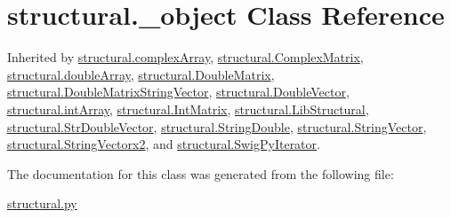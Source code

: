 \hypertarget{classstructural_1_1__object}{}\section{structural.\+\_\+object Class Reference}
\label{classstructural_1_1__object}


Inherited by \hyperlink{classstructural_1_1complex_array}{structural.\+complex\+Array}, \hyperlink{classstructural_1_1_complex_matrix}{structural.\+Complex\+Matrix}, \hyperlink{classstructural_1_1double_array}{structural.\+double\+Array}, \hyperlink{classstructural_1_1_double_matrix}{structural.\+Double\+Matrix}, \hyperlink{classstructural_1_1_double_matrix_string_vector}{structural.\+Double\+Matrix\+String\+Vector}, \hyperlink{classstructural_1_1_double_vector}{structural.\+Double\+Vector}, \hyperlink{classstructural_1_1int_array}{structural.\+int\+Array}, \hyperlink{classstructural_1_1_int_matrix}{structural.\+Int\+Matrix}, \hyperlink{classstructural_1_1_lib_structural}{structural.\+Lib\+Structural}, \hyperlink{classstructural_1_1_str_double_vector}{structural.\+Str\+Double\+Vector}, \hyperlink{classstructural_1_1_string_double}{structural.\+String\+Double}, \hyperlink{classstructural_1_1_string_vector}{structural.\+String\+Vector}, \hyperlink{classstructural_1_1_string_vectorx2}{structural.\+String\+Vectorx2}, and \hyperlink{classstructural_1_1_swig_py_iterator}{structural.\+Swig\+Py\+Iterator}.



The documentation for this class was generated from the following file\+:\begin{DoxyCompactItemize}
\item 
\hyperlink{structural_8py}{structural.\+py}\end{DoxyCompactItemize}
